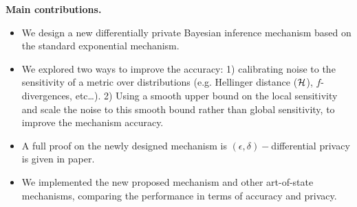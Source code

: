 \documentclass{article}
\begin{document}
\noindent \textbf{Main contributions.}
\begin{itemize}
	\item We design a new differentially private Bayesian inference mechanism based on the standard exponential mechanism.
	\item We explored two ways to improve the accuracy: 1) calibrating noise to the sensitivity of a metric over distributions (e.g. Hellinger distance ($\mathcal{H}$), $f$-divergences, etc\dots). 2) Using a smooth upper bound on the local sensitivity and scale the noise to this smooth bound rather than global sensitivity, to improve the mechanism accuracy.
  \item A full proof on the newly designed mechanism is $(\epsilon, \delta)-$differential privacy is given in paper.
	\item We implemented the new proposed mechanism and other art-of-state mechanisms, comparing the performance in terms of accuracy and privacy.
\end{itemize}
\end{document}
